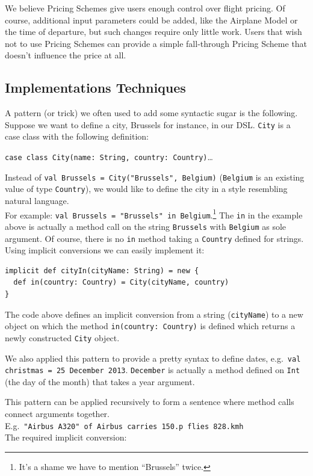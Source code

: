 \documentclass[a4paper]{article}
\newcommand{\cc}[1]{\texttt{#1}}
\renewcommand{\sc}[1]{\lstinline{#1}}
\begin{document}
We believe Pricing Schemes give users enough control over flight pricing.
Of course, additional input parameters could be added, like the Airplane Model or the time of departure, but such changes require only little work.
Users that wish not to use Pricing Schemes can provide a simple fall-through Pricing Scheme that doesn't influence the price at all.

\subsection{Implementations Techniques}
\label{sec:implementation-techniques}

A pattern (or trick) we often used to add some syntactic sugar is the following.
Suppose we want to define a city, Brussels for instance, in our DSL.\@
\cc{City} is a case class with the following definition:

\sc{case class City(name: String, country: Country)}\ldots{}

Instead of \sc{val Brussels = City("Brussels", Belgium)} (\cc{Belgium} is an existing value of type \cc{Country}), we would like to define the city in a style resembling natural language.\\
For example: \sc{val Brussels = "Brussels" in Belgium}.\footnote{It's a shame we have to mention ``Brussels'' twice.}
The \sc{in} in the example above is actually a method call on the string \cc{Brussels} with \cc{Belgium} as sole argument.
Of course, there is no \sc{in} method taking a \cc{Country} defined for strings.
Using implicit conversions we can easily implement it:

\begin{lstlisting}
implicit def cityIn(cityName: String) = new {
  def in(country: Country) = City(cityName, country)
}
\end{lstlisting}

The code above defines an implicit conversion from a string (\sc{cityName}) to a new object on which the method \sc{in(country: Country)} is defined which returns a newly constructed \cc{City} object.

We also applied this pattern to provide a pretty syntax to define dates, e.g.\ \sc{val christmas = 25 December 2013}.
\cc{December} is actually a method defined on \cc{Int} (the day of the month) that takes a year argument.

This pattern can be applied recursively to form a sentence where method calls connect arguments together.\\
E.g.\ \sc{"Airbus A320" of Airbus carries 150.p flies 828.kmh}\\
The required implicit conversion:
\end{document}
